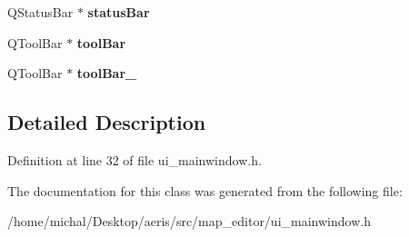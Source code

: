 \begin{DoxyCompactItemize}
\item 
\hypertarget{classUi__MainWindow_afa919f3af6f2f526a70f1fa331f63724}{Q\-Status\-Bar $\ast$ {\bfseries status\-Bar}}\label{classUi__MainWindow_afa919f3af6f2f526a70f1fa331f63724}

\item 
\hypertarget{classUi__MainWindow_aa5995b25981cecee563973a0e5de1739}{Q\-Tool\-Bar $\ast$ {\bfseries tool\-Bar}}\label{classUi__MainWindow_aa5995b25981cecee563973a0e5de1739}

\item 
\hypertarget{classUi__MainWindow_a0984bccf02cc63fd5cd1810af9e37185}{Q\-Tool\-Bar $\ast$ {\bfseries tool\-Bar\-\_}}\label{classUi__MainWindow_a0984bccf02cc63fd5cd1810af9e37185}

\end{DoxyCompactItemize}


\subsection{Detailed Description}


Definition at line 32 of file ui\-\_\-mainwindow.\-h.



The documentation for this class was generated from the following file\-:\begin{DoxyCompactItemize}
\item 
/home/michal/\-Desktop/aeris/src/map\-\_\-editor/ui\-\_\-mainwindow.\-h\end{DoxyCompactItemize}
